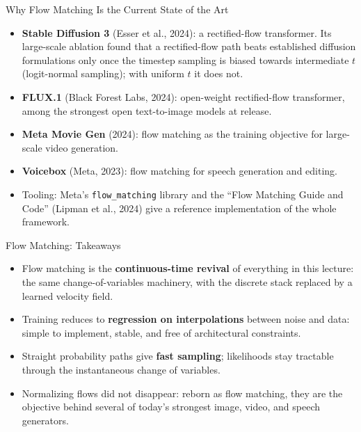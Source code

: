 \begin{frame}{Why Flow Matching Is the Current State of the Art}
\begin{itemize}
    \item \textbf{Stable Diffusion 3} (Esser et al., 2024): a rectified-flow transformer. Its large-scale ablation found that a rectified-flow path beats established diffusion formulations only once the timestep sampling is biased towards intermediate $t$ (logit-normal sampling); with uniform $t$ it does not.
    \item \textbf{FLUX.1} (Black Forest Labs, 2024): open-weight rectified-flow transformer, among the strongest open text-to-image models at release.
    \item \textbf{Meta Movie Gen} (2024): flow matching as the training objective for large-scale video generation.
    \item \textbf{Voicebox} (Meta, 2023): flow matching for speech generation and editing.
    \item Tooling: Meta's \texttt{flow\_matching} library and the ``Flow Matching Guide and Code'' (Lipman et al., 2024) give a reference implementation of the whole framework.
\end{itemize}
\end{frame}

\begin{frame}{Flow Matching: Takeaways}
\begin{itemize}
    \item Flow matching is the \textbf{continuous-time revival} of everything in this lecture: the same change-of-variables machinery, with the discrete stack replaced by a learned velocity field.
    \item Training reduces to \textbf{regression on interpolations} between noise and data: simple to implement, stable, and free of architectural constraints.
    \item Straight probability paths give \textbf{fast sampling}; likelihoods stay tractable through the instantaneous change of variables.
    \item Normalizing flows did not disappear: reborn as flow matching, they are the objective behind several of today's strongest image, video, and speech generators.
\end{itemize}
\end{frame}

